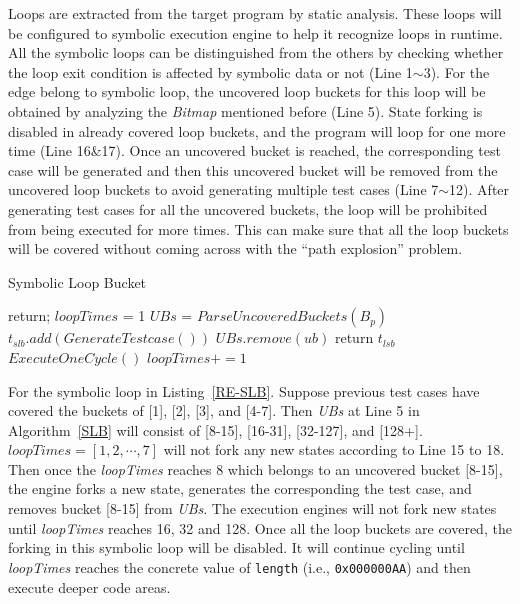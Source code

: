 Loops are extracted from the target program by static analysis. These loops will be configured to symbolic execution engine to help it recognize loops in runtime. All the symbolic loops can be distinguished from the others by checking whether the loop exit condition is affected by symbolic data or not (Line 1$\sim$3). For the edge belong to symbolic loop, the uncovered loop buckets for this loop will be obtained by analyzing the \textit{Bitmap} mentioned before (Line 5). 
State forking is disabled in already covered loop buckets, and the program will loop for one more time (Line 16\&17). Once an uncovered bucket is reached, the corresponding test case will be generated and then this uncovered bucket will be removed from the uncovered loop buckets to avoid generating multiple test cases (Line 7$\sim$12). After generating test cases for all the uncovered buckets, the loop will be prohibited from being executed for more times. This can make sure that all the loop buckets will be covered without coming across with the ``path explosion'' problem.

\begin{algorithm}
  \caption{Symbolic Loop Bucket}
  \label{SLB}
  {
    return;
  }
  $loopTimes$ = 1\;
  $UBs$ = $ParseUncoveredBuckets(B_p)$\;
  {
    {
      {
        $t_{slb}.add(GenerateTestcase())$\;
        $UBs$.$remove(ub)$\;
      }
    }
    {
      return $t_{lsb}$\;
    }{
      $ExecuteOneCycle()$\;
      $loopTimes += 1$\;
    }
  }
\end{algorithm}  

For the symbolic loop in Listing~\ref{RE-SLB}. Suppose previous test cases have covered the buckets of [1], [2], [3], and [4-7]. Then \textit{UBs} at Line 5 in Algorithm~\ref{SLB} will consist of [8-15], [16-31], [32-127], and [128+]. $\textit{loopTimes}=[1, 2, \cdots, 7]$ will not fork any new states according to Line 15 to 18. Then once the \textit{loopTimes} reaches 8 which belongs to an uncovered bucket [8-15], the engine forks a new state,  generates the corresponding the test case, and removes bucket [8-15] from \textit{UBs}. The execution engines will not fork new states until \textit{loopTimes} reaches 16, 32 and 128. Once all the loop buckets are covered, the forking in this symbolic loop will be disabled. It will continue cycling until \textit{loopTimes} reaches the concrete value of \texttt{length} (i.e., \texttt{0x000000AA}) and then execute deeper code areas.
